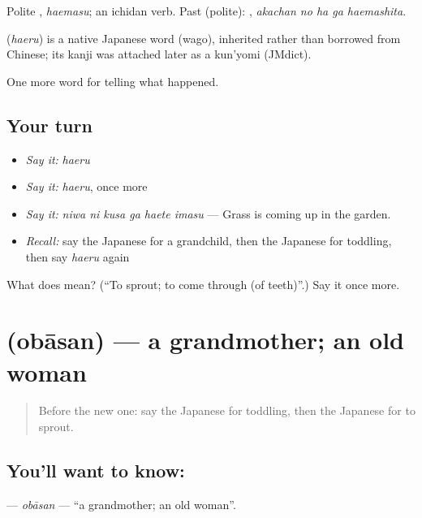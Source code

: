 Polite \textbf{}, \emph{haemasu}; an ichidan verb. Past (polite): \textbf{  }, \emph{akachan no ha ga haemashita}.

\begin{cousinweb}
\textbf{} (\emph{haeru}) is a native Japanese word (wago), inherited rather than borrowed from Chinese; its kanji was attached later as a kun'yomi (JMdict).
\end{cousinweb}

\begin{grammarlens}[title={What you've built}]
One more word for telling what happened.
\end{grammarlens}

\subsection*{Your turn}
\begin{itemize}
\raggedright
  \item \emph{Say it:} \emph{haeru}
  \item \emph{Say it:} \emph{haeru}, once more
  \item \emph{Say it:} \emph{niwa ni kusa ga haete imasu} — Grass is coming up in the garden.
  \item \emph{Recall:} say the Japanese for a grandchild, then the Japanese for toddling, then say \emph{haeru} again
\end{itemize}

\begin{tcolorbox}[breakable,colback=teal!4,colframe=teal!35!black,title={Before you move on}]
What does  mean? (\textquotedblleft{}To sprout; to come through (of teeth)\textquotedblright{}.) Say it once more.
\end{tcolorbox}
\section[\texorpdfstring{\ja{おばあさん} (obāsan)}{おばあさん (obāsan)}]{ (obāsan) — a grandmother; an old woman}

\label{lesson:JA-C287-obaasan}



\begin{quote}
Before the new one: say the Japanese for toddling, then the Japanese for to sprout.
\end{quote}

\subsection*{You'll want to know: }
\textbf{} — \emph{obāsan} — \textquotedblleft{}a grandmother; an old woman\textquotedblright{}.

